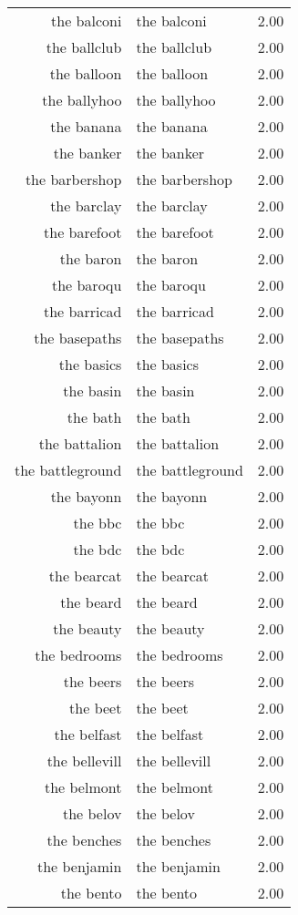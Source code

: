 \begin{table}[ht]
\begin{tabular}{rlr}
  the balconi & the balconi & 2.00 \\ 
  the ballclub & the ballclub & 2.00 \\ 
  the balloon & the balloon & 2.00 \\ 
  the ballyhoo & the ballyhoo & 2.00 \\ 
  the banana & the banana & 2.00 \\ 
  the banker & the banker & 2.00 \\ 
  the barbershop & the barbershop & 2.00 \\ 
  the barclay & the barclay & 2.00 \\ 
  the barefoot & the barefoot & 2.00 \\ 
  the baron & the baron & 2.00 \\ 
  the baroqu & the baroqu & 2.00 \\ 
  the barricad & the barricad & 2.00 \\ 
  the basepaths & the basepaths & 2.00 \\ 
  the basics & the basics & 2.00 \\ 
  the basin & the basin & 2.00 \\ 
  the bath & the bath & 2.00 \\ 
  the battalion & the battalion & 2.00 \\ 
  the battleground & the battleground & 2.00 \\ 
  the bayonn & the bayonn & 2.00 \\ 
  the bbc & the bbc & 2.00 \\ 
  the bdc & the bdc & 2.00 \\ 
  the bearcat & the bearcat & 2.00 \\ 
  the beard & the beard & 2.00 \\ 
  the beauty & the beauty & 2.00 \\ 
  the bedrooms & the bedrooms & 2.00 \\ 
  the beers & the beers & 2.00 \\ 
  the beet & the beet & 2.00 \\ 
  the belfast & the belfast & 2.00 \\ 
  the bellevill & the bellevill & 2.00 \\ 
  the belmont & the belmont & 2.00 \\ 
  the belov & the belov & 2.00 \\ 
  the benches & the benches & 2.00 \\ 
  the benjamin & the benjamin & 2.00 \\ 
  the bento & the bento & 2.00 \\ 

\end{tabular}
\end{table}
